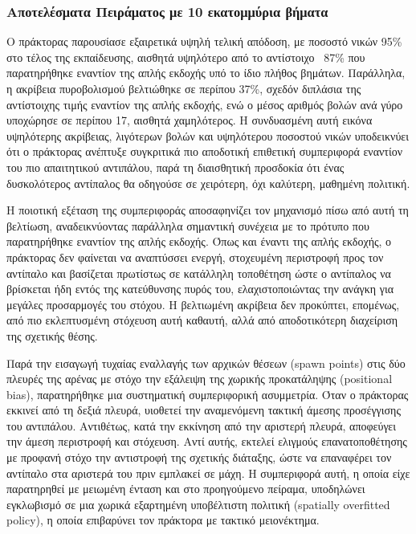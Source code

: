 \documentclass[12pt]{article}
\begin{document}
\subsubsection{Αποτελέσματα Πειράματος με 10 εκατομμύρια βήματα}
Ο πράκτορας παρουσίασε εξαιρετικά υψηλή τελική απόδοση, με ποσοστό νικών 95\% στο τέλος της εκπαίδευσης, αισθητά υψηλότερο από το αντίστοιχο ~87\% που παρατηρήθηκε εναντίον της απλής εκδοχής υπό το ίδιο πλήθος βημάτων. Παράλληλα, η ακρίβεια πυροβολισμού βελτιώθηκε σε περίπου 37\%, σχεδόν διπλάσια της αντίστοιχης τιμής εναντίον της απλής εκδοχής, ενώ ο μέσος αριθμός βολών ανά γύρο υποχώρησε σε περίπου 17, αισθητά χαμηλότερος. Η συνδυασμένη αυτή εικόνα υψηλότερης ακρίβειας, λιγότερων βολών και υψηλότερου ποσοστού νικών υποδεικνύει ότι ο πράκτορας ανέπτυξε συγκριτικά πιο αποδοτική επιθετική συμπεριφορά εναντίον του πιο απαιτητικού αντιπάλου, παρά τη διαισθητική προσδοκία ότι ένας δυσκολότερος αντίπαλος θα οδηγούσε σε χειρότερη, όχι καλύτερη, μαθημένη πολιτική.

Η ποιοτική εξέταση της συμπεριφοράς αποσαφηνίζει τον μηχανισμό πίσω από αυτή τη βελτίωση, αναδεικνύοντας παράλληλα σημαντική συνέχεια με το πρότυπο που παρατηρήθηκε εναντίον της απλής εκδοχής. Όπως και έναντι της απλής εκδοχής, ο πράκτορας δεν φαίνεται να αναπτύσσει ενεργή, στοχευμένη περιστροφή προς τον αντίπαλο και βασίζεται πρωτίστως σε κατάλληλη τοποθέτηση ώστε ο αντίπαλος να βρίσκεται ήδη εντός της κατεύθυνσης πυρός του, ελαχιστοποιώντας την ανάγκη για μεγάλες προσαρμογές του στόχου. Η βελτιωμένη ακρίβεια δεν προκύπτει, επομένως, από πιο εκλεπτυσμένη στόχευση αυτή καθαυτή, αλλά από αποδοτικότερη διαχείριση της σχετικής θέσης.

Παρά την εισαγωγή τυχαίας εναλλαγής των αρχικών θέσεων (spawn points) στις δύο πλευρές της αρένας με στόχο την εξάλειψη της χωρικής προκατάληψης (positional bias), παρατηρήθηκε μια συστηματική συμπεριφορική ασυμμετρία. Όταν ο πράκτορας εκκινεί από τη δεξιά πλευρά, υιοθετεί την αναμενόμενη τακτική άμεσης προσέγγισης του αντιπάλου. Αντιθέτως, κατά την εκκίνηση από την αριστερή πλευρά, αποφεύγει την άμεση περιστροφή και στόχευση. Αντί αυτής, εκτελεί ελιγμούς επανατοποθέτησης με προφανή στόχο την αντιστροφή της σχετικής διάταξης, ώστε να επαναφέρει τον αντίπαλο στα αριστερά του πριν εμπλακεί σε μάχη. Η συμπεριφορά αυτή, η οποία είχε παρατηρηθεί με μειωμένη ένταση και στο προηγούμενο πείραμα, υποδηλώνει εγκλωβισμό σε μια χωρικά εξαρτημένη υποβέλτιστη πολιτική (spatially overfitted policy), η οποία επιβαρύνει τον πράκτορα με τακτικό μειονέκτημα.
\end{document}
